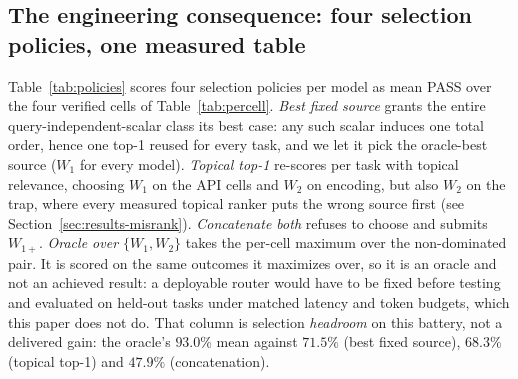 \documentclass[11pt]{article}
\theoremstyle{plain}
\theoremstyle{definition}
\theoremstyle{remark}
\begin{document}
\subsection{The engineering consequence: four selection policies, one measured table}
\label{sec:results-policies}

Table~\ref{tab:policies} scores four selection policies per model as mean PASS over the four
verified cells of Table~\ref{tab:percell}. \emph{Best fixed source} grants the entire
query-independent-scalar class its best case: any such scalar induces one total order, hence one
top-1 reused for every task, and we let it pick the oracle-best source ($W_1$ for every model).
\emph{Topical top-1} re-scores per task with topical relevance, choosing $W_1$ on the API cells
and $W_2$ on encoding, but also $W_2$ on the trap, where every measured topical ranker puts the
wrong source first (see Section~\ref{sec:results-misrank}). \emph{Concatenate both} refuses to choose and
submits $W_{1+}$. \emph{Oracle over $\{W_1,W_2\}$} takes the per-cell maximum over the
non-dominated pair. It is scored on the same outcomes it maximizes over, so it is an oracle and
not an achieved result: a deployable router would have to be fixed before testing and evaluated
on held-out tasks under matched latency and token budgets, which this paper does not do. That
column is selection \emph{headroom} on this battery, not a delivered gain: the oracle's
$93.0\%$ mean against $71.5\%$ (best fixed source), $68.3\%$ (topical top-1) and $47.9\%$
(concatenation).
\end{document}
